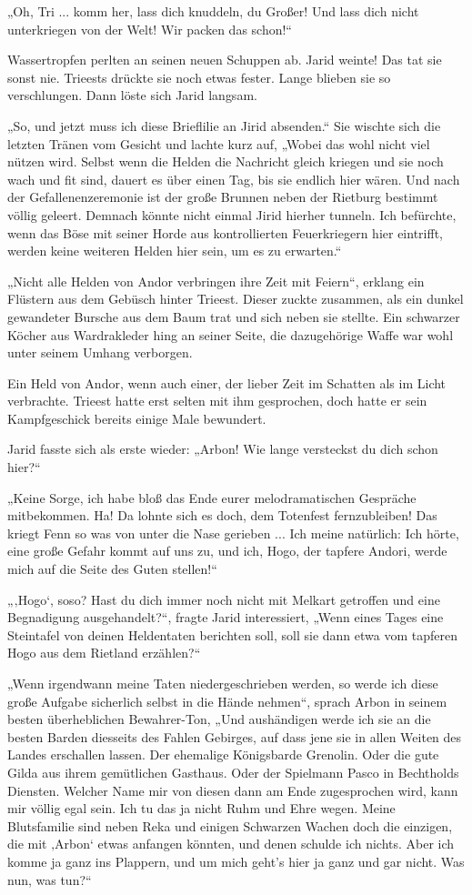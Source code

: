 „Oh, Tri ... komm her, lass dich knuddeln, du Großer! Und lass dich nicht unterkriegen von der Welt! Wir packen das schon!“

Wassertropfen perlten an seinen neuen Schuppen ab. Jarid weinte! Das tat sie sonst nie. Trieests drückte sie noch etwas fester. Lange blieben sie so verschlungen. Dann löste sich Jarid langsam.

„So, und jetzt muss ich diese Brieflilie an Jirid absenden.“ Sie wischte sich die letzten Tränen vom Gesicht und lachte kurz auf, „Wobei das wohl nicht viel nützen wird. Selbst wenn die Helden die Nachricht gleich kriegen und sie noch wach und fit sind, dauert es über einen Tag, bis sie endlich hier wären. Und nach der Gefallenenzeremonie ist der große Brunnen neben der Rietburg bestimmt völlig geleert. Demnach könnte nicht einmal Jirid hierher tunneln. Ich befürchte, wenn das Böse mit seiner Horde aus kontrollierten Feuerkriegern hier eintrifft, werden keine weiteren Helden hier sein, um es zu erwarten.“

„Nicht alle Helden von Andor verbringen ihre Zeit mit Feiern“, erklang ein Flüstern aus dem Gebüsch hinter Trieest. Dieser zuckte zusammen, als ein dunkel gewandeter Bursche aus dem Baum trat und sich neben sie stellte. Ein schwarzer Köcher aus Wardrakleder hing an seiner Seite, die dazugehörige Waffe war wohl unter seinem Umhang verborgen.

Ein Held von Andor, wenn auch einer, der lieber Zeit im Schatten als im Licht verbrachte. Trieest hatte erst selten mit ihm gesprochen, doch hatte er sein Kampfgeschick bereits einige Male bewundert.

Jarid fasste sich als erste wieder: „Arbon! Wie lange versteckst du dich schon hier?“

„Keine Sorge, ich habe bloß das Ende eurer melodramatischen Gespräche mitbekommen. Ha! Da lohnte sich es doch, dem Totenfest fernzubleiben! Das kriegt Fenn so was von unter die Nase gerieben ... Ich meine natürlich: Ich hörte, eine große Gefahr kommt auf uns zu, und ich, Hogo, der tapfere Andori, werde mich auf die Seite des Guten stellen!“

„‚Hogo‘, soso? Hast du dich immer noch nicht mit Melkart getroffen und eine Begnadigung ausgehandelt?“, fragte Jarid interessiert, „Wenn eines Tages eine Steintafel von deinen Heldentaten berichten soll, soll sie dann etwa vom tapferen Hogo aus dem Rietland erzählen?“

„Wenn irgendwann meine Taten niedergeschrieben werden, so werde ich diese große Aufgabe sicherlich selbst in die Hände nehmen“, sprach Arbon in seinem besten überheblichen Bewahrer-Ton, „Und aushändigen werde ich sie an die besten Barden diesseits des Fahlen Gebirges, auf dass jene sie in allen Weiten des Landes erschallen lassen. Der ehemalige Königsbarde Grenolin. Oder die gute Gilda aus ihrem gemütlichen Gasthaus. Oder der Spielmann Pasco in Bechtholds Diensten. Welcher Name mir von diesen dann am Ende zugesprochen wird, kann mir völlig egal sein. Ich tu das ja nicht Ruhm und Ehre wegen. Meine Blutsfamilie sind neben Reka und einigen Schwarzen Wachen doch die einzigen, die mit ‚Arbon‘ etwas anfangen könnten, und denen schulde ich nichts. Aber ich komme ja ganz ins Plappern, und um mich geht’s hier ja ganz und gar nicht. Was nun, was tun?“


